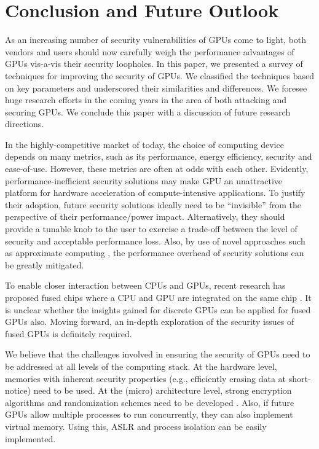 \section{Conclusion and Future Outlook}\label{sec:conclusion}

As an increasing number of security vulnerabilities of GPUs come to light, both vendors and users should now carefully weigh the performance advantages of GPUs vis-a-vis their security loopholes. In this paper, we presented a survey of techniques for improving the security of GPUs. We classified the techniques based on key parameters and underscored their similarities and differences. We foresee huge research efforts in the coming years in the area of  both attacking and securing GPUs. We conclude this paper with a discussion of future research directions. 

In the highly-competitive market of today, the choice of computing device depends on many metrics, such as its performance, energy efficiency, security and ease-of-use. However, these metrics are often at odds with each other. Evidently, performance-inefficient security solutions may make GPU an unattractive platform for hardware acceleration of compute-intensive applications. To justify their adoption, future security solutions ideally need to be ``invisible'' from the perspective of their performance/power impact. Alternatively, they should provide a tunable knob to the user to exercise a trade-off between the level of security and acceptable performance loss. Also, by use of novel approaches such as approximate computing \cite{mittal2016SurveyApprox}, the performance overhead of security solutions can be greatly mitigated.  

To enable closer interaction between CPUs and GPUs, recent research has proposed fused chips where a CPU and GPU are integrated on the same chip \cite{mittal2015cpugpusurvey}. It is unclear whether the insights gained for discrete GPUs can be applied for fused GPUs also. Moving forward, an in-depth exploration of the security issues of fused GPUs is definitely required. 


We believe that  the challenges involved in ensuring the security of GPUs need to be addressed at all levels of the computing stack. At the hardware level, memories with inherent security properties (e.g., efficiently erasing data at short-notice) need to be used. At the (micro) architecture level, strong encryption algorithms and randomization schemes need to be developed \cite{mittal2018SurveyNVMSecurity}. Also, if future GPUs allow multiple processes to run concurrently, they can   also implement virtual memory. Using this, ASLR and process isolation can be easily implemented. 


